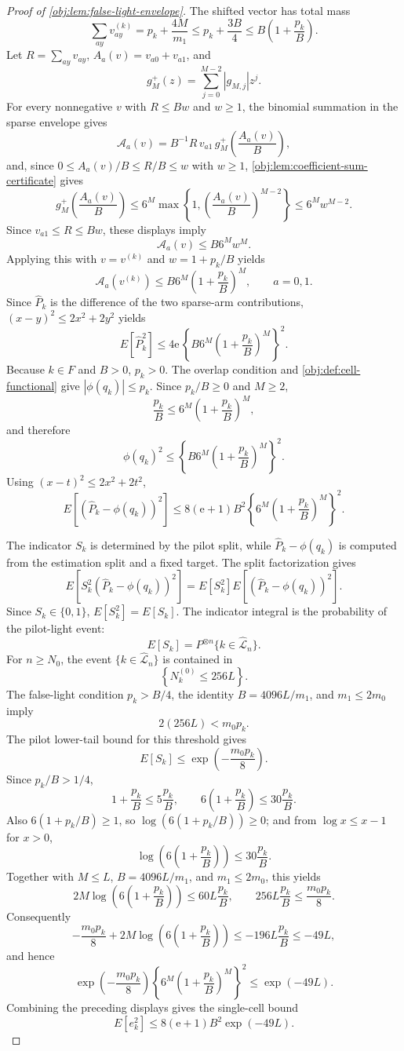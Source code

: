 \documentclass[11pt]{article}
\begin{document}
\begin{proof}[Proof of \cref{obj:lem:false-light-envelope}]
The shifted vector has total mass
\[
\sum_{ay}v^{(k)}_{ay}
=p_k+\frac{4M}{m_1}
\le p_k+\frac{3B}{4}
\le B\left(1+\frac{p_k}{B}\right).
\]
Let \(R=\sum_{ay}v_{ay}\), \(A_a(v)=v_{a0}+v_{a1}\), and
\[
g_M^+(z)=\sum_{j=0}^{M-2}|g_{M,j}|z^j.
\]
For every nonnegative \(v\) with \(R\le Bw\) and \(w\ge1\), the binomial summation in the sparse envelope gives
\[
\mathcal A_a(v)
=
B^{-1}R\,v_{a1}\,g_M^+\!\left(\frac{A_a(v)}B\right),
\]
and, since \(0\le A_a(v)/B\le R/B\le w\) with \(w\ge1\), \cref{obj:lem:coefficient-sum-certificate} gives
\[
g_M^+\!\left(\frac{A_a(v)}B\right)
\le 6^M\max\left\{1,\left(\frac{A_a(v)}B\right)^{M-2}\right\}
\le 6^M w^{M-2}.
\]
Since \(v_{a1}\le R\le Bw\), these displays imply
\[
\mathcal A_a(v)
\le B6^M w^M.
\]
Applying this with \(v=v^{(k)}\) and \(w=1+p_k/B\) yields
\[
\mathcal A_a(v^{(k)})
\le
B6^M\left(1+\frac{p_k}{B}\right)^M,
\qquad a=0,1.
\]
Since \(\widehat P_k\) is the difference of the two sparse-arm contributions, \((x-y)^2\le2x^2+2y^2\) yields
\[
E[\widehat P_k^2]
\le
4\mathrm e\,
\left\{
B6^M\left(1+\frac{p_k}{B}\right)^M
\right\}^2 .
\]
Because \(k\in F\) and \(B>0\), \(p_k>0\).  The overlap condition and \cref{obj:def:cell-functional} give \(|\phi(q_k)|\le p_k\).  Since \(p_k/B\ge0\) and \(M\ge2\),
\[
\frac{p_k}{B}
\le
6^M\left(1+\frac{p_k}{B}\right)^M,
\]
and therefore
\[
\phi(q_k)^2
\le
\left\{
B6^M\left(1+\frac{p_k}{B}\right)^M
\right\}^2 .
\]
Using \((x-t)^2\le2x^2+2t^2\),
\[
E\!\left[(\widehat P_k-\phi(q_k))^2\right]
\le
8(\mathrm e+1)B^2
\left\{6^M\left(1+\frac{p_k}{B}\right)^M\right\}^2 .
\]

The indicator \(S_k\) is determined by the pilot split, while \(\widehat P_k-\phi(q_k)\) is computed from the estimation split and a fixed target.  The split factorization gives
\[
E\!\left[S_k^2(\widehat P_k-\phi(q_k))^2\right]
=
E[S_k^2]E\!\left[(\widehat P_k-\phi(q_k))^2\right].
\]
Since \(S_k\in\{0,1\}\), \(E[S_k^2]=E[S_k]\).  The indicator integral is the probability of the pilot-light event:
\[
E[S_k]
= P^{\otimes n}\{k\in\widehat{\mathcal L}_n\}.
\]
For \(n\ge N_0\), the event \(\{k\in\widehat{\mathcal L}_n\}\) is contained in
\[
\left\{N_k^{(0)}\le 256L\right\}.
\]
The false-light condition \(p_k>B/4\), the identity \(B=4096L/m_1\), and \(m_1\le2m_0\) imply
\[
2(256L)<m_0p_k.
\]
The pilot lower-tail bound for this threshold gives
\[
E[S_k]
\le
\exp\!\left(-\frac{m_0p_k}{8}\right).
\]
Since \(p_k/B>1/4\),
\[
1+\frac{p_k}{B}\le 5\frac{p_k}{B},
\qquad
6\left(1+\frac{p_k}{B}\right)\le30\frac{p_k}{B}.
\]
Also \(6(1+p_k/B)\ge1\), so \(\log(6(1+p_k/B))\ge0\); and from \(\log x\le x-1\) for \(x>0\),
\[
\log\!\left(6\left(1+\frac{p_k}{B}\right)\right)
\le 30\frac{p_k}{B} .
\]
Together with \(M\le L\), \(B=4096L/m_1\), and \(m_1\le2m_0\), this yields
\[
2M\log\!\left(6\left(1+\frac{p_k}{B}\right)\right)
\le60L\frac{p_k}{B},
\qquad
256L\frac{p_k}{B}\le \frac{m_0p_k}{8}.
\]
Consequently
\[
-\frac{m_0p_k}{8}
+2M\log\!\left(6\left(1+\frac{p_k}{B}\right)\right)
\le -196L\frac{p_k}{B}\le -49L,
\]
and hence
\[
\exp\!\left(-\frac{m_0p_k}{8}\right)
\left\{6^M\left(1+\frac{p_k}{B}\right)^M\right\}^2
\le
\exp(-49L).
\]
Combining the preceding displays gives the single-cell bound
\[
E[e_k^2]
\le
8(\mathrm e+1)B^2\exp(-49L).
\]


\end{proof}
\end{document}
